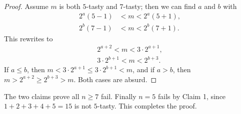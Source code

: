 \begin{proof}
    Assume $m$ is both $5$-tasty and $7$-tasty; then we can find $a$ and $b$ with
    \begin{align*}
        2^a(5-1)&<m<2^a(5+1),\\
        2^b(7-1)&<m<2^b(7+1).
    \end{align*}
    This rewrites to
    \begin{align*}
        2^{a+2}<m<3\cdot2^{a+1},\\
        3\cdot2^{b+1}<m<2^{b+3}.
    \end{align*}
    If $a\le b$, then $m<3\cdot2^{a+1}\le3\cdot2^{b+1}<m$, and if $a>b$, then $m>2^{a+2}\ge2^{b+3}>m$. Both cases are absurd.
\end{proof}

The two claims prove all $n\ge7$ fail. Finally $n=5$ fails by Claim 1, since $1+2+3+4+5=15$ is not $5$-tasty. This completes the proof.


